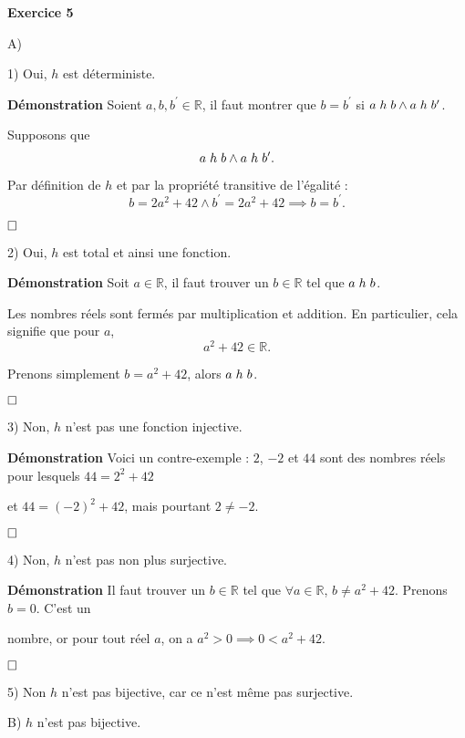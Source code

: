\documentclass{article}
\begin{document}
\textbf{Exercice 5}

\vspace{0.5cm}

A)

1) Oui, $h$ est déterministe.

\textbf{Démonstration} Soient $a, b, b^{\prime} \in \mathbb{R}$, il faut montrer que $b = b^{\prime}$ si $a \hspace{.1cm} h \hspace{.1cm} b \land a \hspace{.1cm} h \hspace{.1cm} b^{\prime}$.

Supposons que  
$$ a \hspace{.1cm} h \hspace{.1cm} b \land a \hspace{.1cm} h \hspace{.1cm} b^{\prime}. $$

Par définition de $h$ et par la propriété transitive de l'égalité :
$$ b = 2a^2 + 42 \land b^{\prime} = 2a^2 + 42 \implies b = b^{\prime}. $$

$\hfill \square$

2) Oui, $h$ est total et ainsi une fonction.

\textbf{Démonstration} Soit $a \in \mathbb{R}$, il faut trouver un $b \in \mathbb{R}$ tel que $a \hspace{.1cm} h \hspace{.1cm} b$.

Les nombres réels sont fermés par multiplication et addition. En particulier, cela signifie que pour $a$, 
$$ a^2 + 42  \in \mathbb{R}. $$

Prenons simplement $b = a^2 + 42$, alors $a \hspace{.1cm} h \hspace{.1cm} b$.

$\hfill \square$

3) Non, $h$ n'est pas une fonction injective.

\textbf{Démonstration} Voici un contre-exemple : $2$, $-2$ et $44$ sont des nombres réels pour lesquels $44 = 2^2 + 42$ 

et $44 = (-2)^2 + 42$, mais pourtant $2 \neq -2$.

$\hfill \square$

4) Non, $h$ n'est pas non plus surjective.

\textbf{Démonstration} Il faut trouver un $b \in \mathbb{R}$ tel que $\forall a \in \mathbb{R}$, $b \neq a^2 + 42$. Prenons $b=0$. C'est un 

nombre, or pour tout réel $a$, on a $a^2 > 0 \implies 0 < a^2 + 42$.

$\hfill \square$

5) Non $h$ n'est pas bijective, car ce n'est même pas surjective.

\vspace{0.5cm}

B) $h$ n'est pas bijective.
\end{document}
